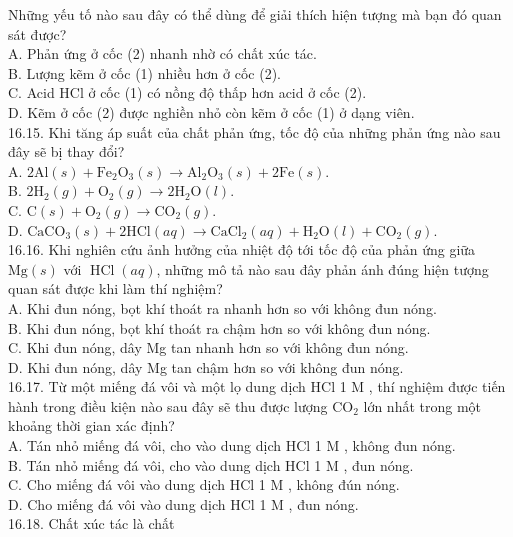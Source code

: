 \documentclass[10pt]{article}
\begin{document}
Những yếu tố nào sau đây có thể dùng để giải thích hiện tượng mà bạn đó quan sát được?\\
A. Phản ứng ở cốc (2) nhanh nhờ có chất xúc tác.\\
B. Lượng kẽm ở cốc (1) nhiều hơn ở cốc (2).\\
C. Acid HCl ở cốc (1) có nồng độ thấp hơn acid ở cốc (2).\\
D. Kẽm ở cốc (2) được nghiền nhỏ còn kẽm ở cốc (1) ở dạng viên.\\
16.15. Khi tăng áp suất của chất phản ứng, tốc độ của những phản ứng nào sau đây sẽ bị thay đổi?\\
A. $2 \mathrm{Al}(s)+\mathrm{Fe}_{2} \mathrm{O}_{3}(s) \rightarrow \mathrm{Al}_{2} \mathrm{O}_{3}(s)+2 \mathrm{Fe}(s)$.\\
B. $2 \mathrm{H}_{2}(g)+\mathrm{O}_{2}(g) \rightarrow 2 \mathrm{H}_{2} \mathrm{O}(l)$.\\
C. $\mathrm{C}(s)+\mathrm{O}_{2}(g) \rightarrow \mathrm{CO}_{2}(g)$.\\
D. $\mathrm{CaCO}_{3}(s)+2 \mathrm{HCl}(a q) \rightarrow \mathrm{CaCl}_{2}(a q)+\mathrm{H}_{2} \mathrm{O}(l)+\mathrm{CO}_{2}(g)$.\\
16.16. Khi nghiên cứu ảnh hưởng của nhiệt độ tới tốc độ của phản ứng giữa $\mathrm{Mg}(s)$ với $\operatorname{HCl}(a q)$, những mô tả nào sau đây phản ánh đúng hiện tượng quan sát được khi làm thí nghiệm?\\
A. Khi đun nóng, bọt khí thoát ra nhanh hơn so với không đun nóng.\\
B. Khi đun nóng, bọt khí thoát ra chậm hơn so với không đun nóng.\\
C. Khi đun nóng, dây Mg tan nhanh hơn so với không đun nóng.\\
D. Khi đun nóng, dây Mg tan chậm hơn so với không đun nóng.\\
16.17. Từ một miếng đá vôi và một lọ dung dịch HCl 1 M , thí nghiệm được tiến hành trong điều kiện nào sau đây sẽ thu được lượng $\mathrm{CO}_{2}$ lớn nhất trong một khoảng thời gian xác định?\\
A. Tán nhỏ miếng đá vôi, cho vào dung dịch HCl 1 M , không đun nóng.\\
B. Tán nhỏ miếng đá vôi, cho vào dung dịch HCl 1 M , đun nóng.\\
C. Cho miếng đá vôi vào dung dịch HCl 1 M , không đún nóng.\\
D. Cho miếng đá vôi vào dung dịch HCl 1 M , đun nóng.\\
16.18. Chất xúc tác là chất\\
\end{document}
